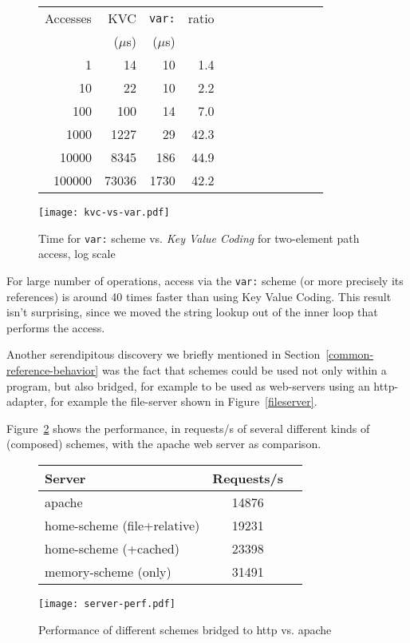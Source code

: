 \documentclass[preprint,authoryear]{llncs}
\begin{document}
\begin{figure}
  \centering
\begin{minipage}[c]{0.38\textwidth}
\begin{tabular}{|r|r|r|r|r|r|r|r|r|r|r|r|} \hline
Accesses  & KVC& {\tt var:}   & ratio	\\ 
 & ($\mu$s) & ($\mu$s) & \\ \hline
1 & 14 & 10 & 1.4   \\ %
10 & 22 & 10 &   2.2 \\   %
100 & 100 & 14 &  7.0\\   %
1000 & 1227 & 29 &  42.3  \\  %
10000 & 8345 & 186 &   44.9 \\   %
100000 & 73036 & 1730 &    42.2 \\ \hline
\end{tabular}
\end{minipage}
\begin{minipage}[c]{0.38\textwidth}
\texttt{[image: kvc-vs-var.pdf]}
\end{minipage}
\caption{Time for  {\tt var:} scheme vs. \emph{Key Value Coding} for two-element path access, log scale}
\label{var-speed}
\end{figure}

For large number of operations, access via the {\tt var:} scheme (or more precisely its references) is
around 40 times faster than using Key Value Coding.  This result isn't surprising, since we
moved the string lookup out of the inner loop that performs the access.

Another serendipitous discovery we briefly mentioned in Section~\ref{common-reference-behavior} was
the fact that schemes could be used not only within a program, but also bridged, for example to be used
as web-servers using an http-adapter, for example the file-server shown in Figure~\ref{fileserver}.

Figure~\ref{http-server-speed} shows the performance, in requests/s of several different kinds of (composed)
schemes, with the apache web server as comparison.  

\begin{figure}
\begin{minipage}[c]{0.58\textwidth}
\begin{tabular}{|l|c|c|} \hline
Server   &  Requests/s    \\ \hline
apache & 	14876	      \\ %
home-scheme (file+relative) &  19231   \\ %
home-scheme (+cached)  &  23398  \\ %
memory-scheme (only) &  31491  \\ \hline
\end{tabular}
\end{minipage}
\begin{minipage}[c]{0.58\textwidth}
\texttt{[image: server-perf.pdf]}
\end{minipage}
\caption{Performance of different schemes bridged to http vs. apache}
\label{http-server-speed}
\end{figure}
\end{document}
